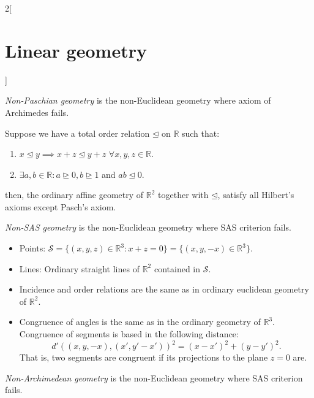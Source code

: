 \documentclass[class=article,10pt,crop=false]{standalone}
\begin{document}
\begin{multicols}{2}[\section{Linear geometry}]
\begin{definition}
\begin{itemize}
\begin{figure}[ht]
        \centering 
    \end{figure} 
\end{itemize}
\end{definition}
\begin{definition}
\textit{Non-Paschian geometry} is the non-Euclidean geometry where axiom of Archimedes fails.
\end{definition}
\begin{prop}
Suppose we have a total order relation $\unlhd$ on $\mathbb{R}$ such that:
\begin{enumerate}
    \item $x\unlhd y\implies x+z\unlhd y+z$ $\forall x,y,z\in\mathbb{R}$.
    \item $\exists a,b\in\mathbb{R}: a\unrhd 0, b\unrhd 1$ and $ab\unlhd 0$.
\end{enumerate}
then, the ordinary affine geometry of $\mathbb{R}^2$ together with $\unlhd$, satisfy all Hilbert's axioms except Pasch's axiom.
\end{prop}
\begin{definition}
\textit{Non-SAS geometry} is the non-Euclidean geometry where SAS criterion fails.
\end{definition}
\begin{prop}
\hfill
\begin{itemize}
    \item Points: $\mathcal{S}=\{(x,y,z)\in\mathbb{R}^3:x+z=0\}=\{(x,y,-x)\in\mathbb{R}^3\}$.
    \item Lines: Ordinary straight lines of $\mathbb{R}^2$ contained in $\mathcal{S}$.
    \item Incidence and order relations are the same as in ordinary euclidean geometry of $\mathbb{R}^2$.
    \item Congruence of angles is the same as in the ordinary geometry of $\mathbb{R}^3$. Congruence of segments is based in the following distance:  $$d'((x,y,-x),(x',y'-x'))^2=(x-x')^2+(y-y')^2.$$ That is, two segments are congruent if its projections to the plane $z=0$ are.
\end{itemize}
\end{prop}
\begin{definition}
\textit{Non-Archimedean geometry} is the non-Euclidean geometry where SAS criterion fails.
\end{definition}

\end{multicols}
\end{document}
